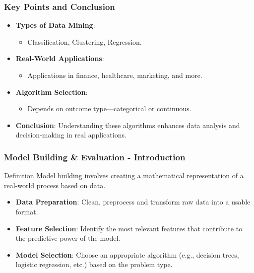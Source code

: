 \documentclass{beamer}
\begin{document}
\begin{frame}[fragile]
    \frametitle{Key Points and Conclusion}
    \begin{itemize}
        \item \textbf{Types of Data Mining}: 
        \begin{itemize}
            \item Classification, Clustering, Regression.
        \end{itemize}
        \item \textbf{Real-World Applications}:
        \begin{itemize}
            \item Applications in finance, healthcare, marketing, and more.
        \end{itemize}
        \item \textbf{Algorithm Selection}:
        \begin{itemize}
            \item Depends on outcome type—categorical or continuous.
        \end{itemize}
        \item \textbf{Conclusion}: Understanding these algorithms enhances data analysis and decision-making in real applications.
    \end{itemize}
\end{frame}

\begin{frame}[fragile]
    \frametitle{Model Building \& Evaluation - Introduction}
    \begin{block}{Definition}
        Model building involves creating a mathematical representation of a real-world process based on data.
    \end{block}
    \begin{itemize}
        \item \textbf{Data Preparation}: Clean, preprocess and transform raw data into a usable format.
        \item \textbf{Feature Selection}: Identify the most relevant features that contribute to the predictive power of the model.
        \item \textbf{Model Selection}: Choose an appropriate algorithm (e.g., decision trees, logistic regression, etc.) based on the problem type.
    \end{itemize}
\end{frame}
\end{document}
